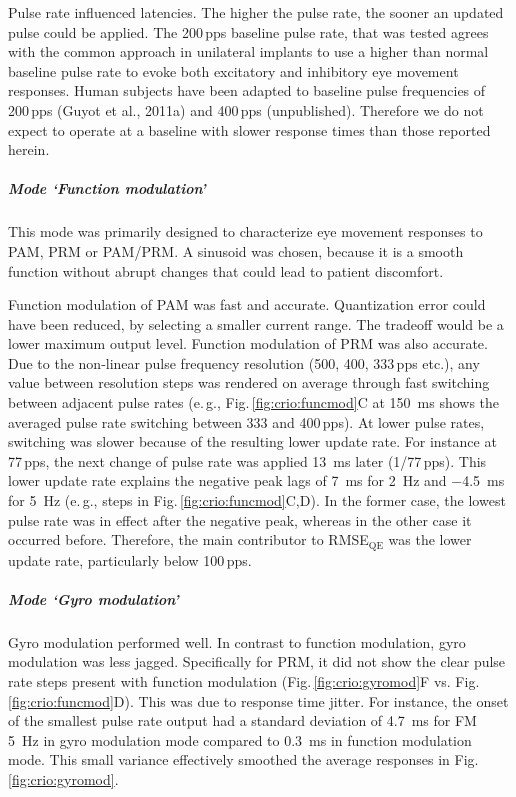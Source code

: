 Pulse rate influenced latencies. The higher the pulse rate, the sooner an updated pulse could be applied. The 200\,pps baseline pulse rate, that was tested agrees with the common approach in unilateral implants to use a higher than normal baseline pulse rate to evoke both excitatory and inhibitory eye movement responses. Human subjects have been adapted to baseline pulse frequencies of 200\,pps (Guyot et al., 2011a) and 400\,pps (unpublished). Therefore we do not expect to operate at a baseline with slower response times than those reported herein.

\subparagraph{Mode ‘Function modulation’}
This mode was primarily designed to characterize eye movement responses to PAM, PRM or PAM/PRM. A sinusoid was chosen, because it is a smooth function without abrupt changes that could lead to patient discomfort. 

Function modulation of PAM was fast and accurate. Quantization error could have been reduced, by selecting a smaller current range. The tradeoff would be a lower maximum output level. 
Function modulation of PRM was also accurate. Due to the non-linear pulse frequency resolution (500, 400, 333\,pps etc.), any value between resolution steps was rendered on average through fast switching between adjacent pulse rates (e.\,g., Fig.\,\ref{fig:crio:funcmod}C at \SI{150}{\milli\second} shows the averaged pulse rate switching between 333 and 400\,pps). At lower pulse rates, switching was slower because of the resulting lower update rate. For instance at 77\,pps, the next change of pulse rate was applied \SI{13}{\milli\second} later (1/77\,pps). This lower update rate explains the negative peak lags of \SI{7}{\milli\second} for \SI{2}{\hertz} and \SI{-4.5}{\milli\second} for \SI{5}{\hertz} (e.\,g., steps in Fig.\,\ref{fig:crio:funcmod}C,D). In the former case, the lowest pulse rate was in effect after the negative peak, whereas in the other case it occurred before. Therefore, the main contributor to RMSE$_{\text{QE}}$ was the lower update rate, particularly below 100\,pps.

\subparagraph{Mode ‘Gyro modulation’}
Gyro modulation performed well. In contrast to function modulation, gyro modulation was less jagged. Specifically for PRM, it did not show the clear pulse rate steps present with function modulation (Fig.\,\ref{fig:crio:gyromod}F vs. Fig.\,\ref{fig:crio:funcmod}D). This was due to response time jitter. For instance, the onset of the smallest pulse rate output had a standard deviation of \SI{4.7}{\milli\second} for FM \SI{5}{\hertz} in gyro modulation mode compared to \SI{0.3}{\milli\second} in function modulation mode. This small variance effectively smoothed the average responses in Fig.\,\ref{fig:crio:gyromod}.

